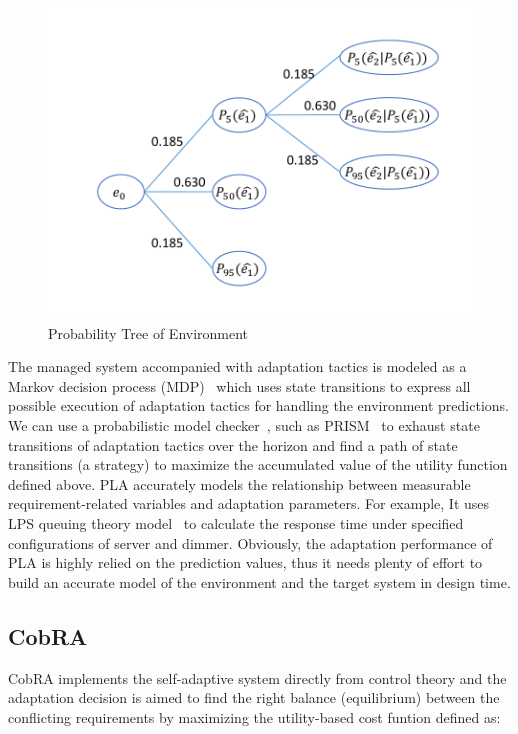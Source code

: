 \documentclass[sigconf]{acmart}
\begin{document}
\begin{figure}[!htp]
	\centering	
	\includegraphics[width=\linewidth]{envtree}	
	\caption{Probability Tree of Environment}
	\label{fig:envtree}
\end{figure}

The managed system accompanied with adaptation tactics is modeled as a Markov decision process (MDP)~\cite{puterman2014markov} which uses state transitions to express all possible execution of adaptation tactics for handling the environment predictions. We can use a probabilistic model checker~\cite{moreno2015proactive}, such as PRISM~\cite{kwiatkowska2011prism} to exhaust state transitions of adaptation tactics over the horizon and find a path of state transitions (a strategy) to maximize the accumulated value of the utility function defined above. PLA accurately models the relationship between measurable requirement-related variables and adaptation parameters. For example, It uses LPS queuing theory model~\cite{zhang2008steady} to calculate the response time under specified configurations of server and dimmer. Obviously, the adaptation performance of PLA is highly relied on the prediction values, thus it needs plenty of effort to build an accurate model of the environment and the target system in design time.

\subsection{CobRA}
CobRA implements the self-adaptive system directly from control theory and the adaptation decision is aimed to find the right balance (equilibrium) between the conflicting requirements by maximizing the utility-based cost funtion defined as:
\end{document}
